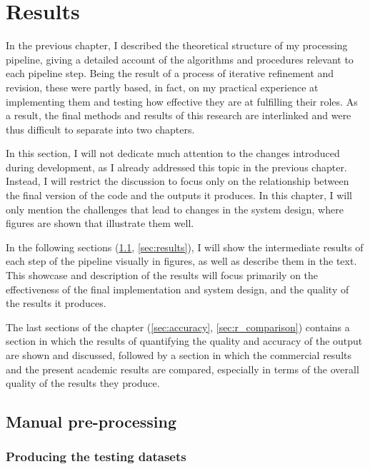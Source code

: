 
\chapter{Results}
\label{chap:r}

In the previous chapter, I described the theoretical structure of my processing pipeline, giving a detailed account of the algorithms and procedures relevant to each pipeline step. Being the result of a process of iterative refinement and revision, these were partly based, in fact, on my practical experience at implementing them and testing how effective they are at fulfilling their roles. As a result, the final methods and results of this research are interlinked and were thus difficult to separate into two chapters.

In this section, I will not dedicate much attention to the changes introduced during development, as I already addressed this topic in the previous chapter. Instead, I will restrict the discussion to focus only on the relationship between the final version of the code and the outputs it produces. In this chapter, I will only mention the challenges that lead to changes in the system design, where figures are shown that illustrate them well.

In the following sections (\ref{sec:manualpreprocessing}, \ref{sec:results}), I will show the intermediate results of each step of the pipeline visually in figures, as well as describe them in the text. This showcase and description of the results will focus primarily on the effectiveness of the final implementation and system design, and the quality of the results it produces.

The last sections of the chapter (\ref{sec:accuracy}, \ref{sec:r_comparison}) contains a section in which the results of quantifying the quality and accuracy of the output are shown and discussed, followed by a section in which the commercial results and the present academic results are compared, especially in terms of the overall quality of the results they produce.

\section{Manual pre-processing}
\label{sec:manualpreprocessing}

\subsection{Producing the testing datasets}
\label{sub:testingdataproduction}

